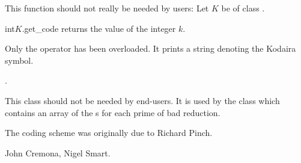 
\ACCS

This function should not really be needed by users: Let $K$ be of class .

\begin{cfcode}{int}{$K$.get_code}{}
  returns the value of the integer $k$.
\end{cfcode}



\IO

Only the  operator \code{<<} has been overloaded.  It prints a string denoting the
Kodaira symbol.



\SEEALSO



.



\NOTES

This class should not be needed by end-users.  It is used by the class  which contains an array of the s for each prime of bad reduction.

The coding scheme was originally due to Richard Pinch.



\AUTHOR

John Cremona, Nigel Smart.
